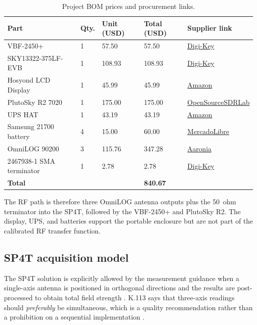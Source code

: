 \documentclass[11pt,a4paper]{article}
\begin{document}
\begin{table}[ht]
\centering
\small
\caption{Project BOM prices and procurement links.}\label{tab:bom-prices}
\begin{tabularx}{\textwidth}{L{0.29\textwidth}C{0.07\textwidth}R{0.12\textwidth}R{0.13\textwidth}X}
\toprule
\textbf{Part} & \textbf{Qty.} & \textbf{Unit (USD)} & \textbf{Total (USD)} & \textbf{Supplier link}\\
\midrule
VBF-2450+ & 1 & 57.50 & 57.50 & \href{https://www.digikey.com/en/products/detail/mini-circuits/VBF-2450/27669500}{Digi-Key}\\
SKY13322-375LF-EVB & 1 & 108.93 & 108.93 & \href{https://www.digikey.com/en/products/detail/skyworks-solutions-inc/SKY13322-375LF-EVB/2356519}{Digi-Key}\\
Hosyond LCD Display & 1 & 45.99 & 45.99 & \href{https://www.amazon.com/-/es/Hosyond-pantalla-pulgadas-capacitiva-Raspberry/dp/B09XKC53NH/}{Amazon}\\
PlutoSky R2 7020 & 1 & 175.00 & 175.00 & \href{https://opensourcesdrlab.com/products/plutosky-r2?VariantsId=10403}{OpenSourceSDRLab}\\
UPS HAT & 1 & 43.19 & 43.19 & \href{https://www.amazon.com/Uninterruptible-UPS-HAT-Raspberry-Bi-Directional/dp/B0DLW2G9K6}{Amazon}\\
Samsung 21700 battery & 4 & 15.00 & 60.00 & \href{https://www.mercadolibre.com.co/1-x-bateria-de-litio-samsung-21700-recargable-5000mah-37v/p/MCO2084532948}{MercadoLibre}\\
OmniLOG 90200 & 3 & 115.76 & 347.28 & \href{https://aaronia.com/es/breitband-antenne-omnilog-90200}{Aaronia}\\
2467938-1 SMA terminator & 1 & 2.78 & 2.78 & \href{https://www.digikey.com/en/products/detail/te-connectivity-linx/2467938-1/22535225}{Digi-Key}\\
\midrule
\textbf{Total} & & & \textbf{840.67} & \\
\bottomrule
\end{tabularx}
\end{table}

The RF path is therefore three OmniLOG antenna outputs plus the 50~ohm terminator into the SP4T, followed by the VBF-2450+ and PlutoSky R2. The display, UPS, and batteries support the portable enclosure but are not part of the calibrated RF transfer function.

\subsection{SP4T acquisition model}
The SP4T solution is explicitly allowed by the measurement guidance when a single-axis antenna is positioned in orthogonal directions and the results are post-processed to obtain total field strength \cite[Sec.~9.2 and Table~I.1 footnote~b]{ITU-T-K.100}. K.113 says that three-axis readings should \emph{preferably} be simultaneous, which is a quality recommendation rather than a prohibition on a sequential implementation \cite[Sec.~7.1.1]{ITU-T-K.113}.
\end{document}

